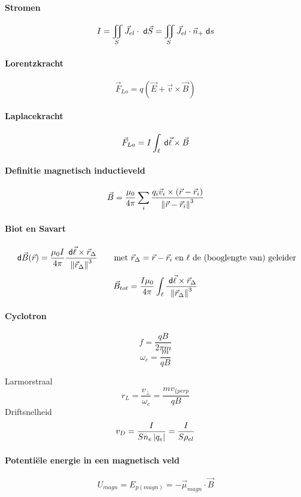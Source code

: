 \paragraph{Stromen}
\[
  I = \iint_S \vec{J}_{el} \cdot \;\textsf{d}\vec{S} = \iint_S \vec{J}_{el} \cdot \vec{n}_+ \;\textsf{d}s
\]


\paragraph{Lorentzkracht}
\[
  \vec{F}_{Lo} = q \left(\vec{E} + \vec{v} \times \vec{B} \right)
\]


\paragraph{Laplacekracht}
\[
  \vec{F}_{La} = I \int_{\ell} \;\textsf{d}\vec{\ell} \times \vec{B}
\]

\paragraph{Definitie magnetisch inductieveld}
\[
  \vec{B} = \frac{\mu_0}{4\pi} \sum_i \frac{q_i \vec{v}_i \times \left( \vec{r} - \vec{r}_i \right) }{\left\| \vec{r} - \vec{r}_i \right\|^3}
\]


\paragraph{Biot en Savart}
\[
  \;\textsf{d}\vec{B}(\vec{r}) = \frac{\mu_0 I}{4\pi} \frac{\;\textsf{d}\vec{\ell} \times \vec{r}_\Delta}{\left\| \vec{r}_\Delta \right\|^3} 
  \qquad
  \mbox{met $\vec{r}_\Delta = \vec{r} - \vec{r}_i$ en $\ell$ de (booglengte van) geleider} 
\]
\[
  \vec{B}_{tot} = \frac{I \mu_0}{4\pi} \int_\ell \frac{\;\textsf{d}\vec{\ell} \times \vec{r}_\Delta}{\left\| \vec{r}_\Delta \right\|^3}
\]

\paragraph{Cyclotron}
\[
  f = \frac{qB}{2\pi m}
\]
\[
  \omega_c = \frac{m}{qB}
\]

Larmorstraal
\[
  r_L = \frac{v_{\perp}}{\omega_c} = \frac{mv_{\{perp}}{qB}
\]
Driftsnelheid
\[
  v_D = \frac{I}{S n_e \left| q_e \right|} = \frac{I}{S \rho_{el}}
\]

\paragraph{Potentiële energie in een magnetisch veld}
\[
  U_{magn} = E_{p(magn)} = - \vec{\mu}_{magn} \cdot \vec{B}
\]


